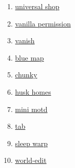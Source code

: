 \begin{enumerate}
    \item \href{https://github.com/Patbox/UniversalShops}{universal shop}
    \item \href{https://github.com/DrexHD/VanillaPermissions}{vanilla permission}
    \item \href{https://github.com/DrexHD/Vanish}{vanish}
    \item \href{https://github.com/BlueMap-Minecraft/BlueMap}{blue map}
    \item \href{https://github.com/pop4959/Chunky}{chunky}
    \item \href{https://github.com/WiIIiam278/HuskHomes/}{husk homes}
    \item \href{https://github.com/jpenilla/MiniMOTD}{mini motd}
    \item \href{https://github.com/NEZNAMY/TAB}{tab}
    \item \href{https://github.com/Giggitybyte/SleepWarp}{sleep warp}
    \item \href{https://github.com/EngineHub/WorldEdit/}{world-edit}
\end{enumerate}


